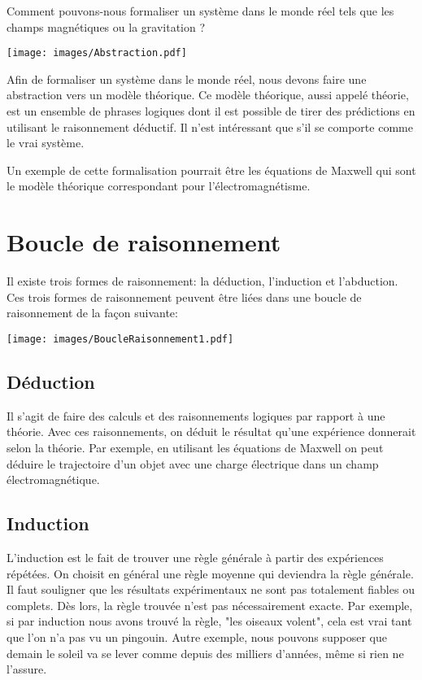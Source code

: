 Comment pouvons-nous formaliser un système dans le monde réel tels que les champs magnétiques ou la gravitation ?

\begin{center}
\texttt{[image: images/Abstraction.pdf]}
\end{center}

Afin de formaliser un système dans le monde réel, nous devons faire une abstraction vers un modèle théorique. Ce modèle théorique, aussi appelé théorie, est un ensemble de phrases logiques dont il est possible de tirer des prédictions en utilisant le raisonnement déductif. Il n'est intéressant que s'il se comporte comme le vrai système.

Un exemple de cette formalisation pourrait être les équations de Maxwell qui sont le modèle théorique correspondant pour l'électromagnétisme.

\section{Boucle de raisonnement}

Il existe trois formes de raisonnement: la déduction, l'induction et l'abduction. Ces trois formes de raisonnement peuvent être liées dans une boucle de raisonnement de la façon suivante:

\begin{center}
\texttt{[image: images/BoucleRaisonnement1.pdf]}
\end{center}

\subsection{Déduction}

Il s'agit de faire des calculs et des raisonnements logiques par rapport à une théorie. 
Avec ces raisonnements, on déduit le résultat qu'une expérience donnerait selon la théorie.
Par exemple, en utilisant les équations de Maxwell on peut déduire le trajectoire d'un
objet avec une charge électrique dans un champ électromagnétique.  \\

\subsection{Induction}

L'induction est le fait de trouver une règle générale à partir des expériences répétées.
On choisit en général une règle moyenne qui deviendra la règle générale.  Il faut souligner que les résultats expérimentaux ne sont pas totalement fiables ou complets. Dès lors, la règle trouvée n'est pas nécessairement exacte.  Par exemple, si par induction nous avons trouvé la règle, "les oiseaux volent", cela est vrai tant que l'on n’a pas vu un pingouin. Autre exemple, nous pouvons supposer que demain le soleil va se lever comme depuis des milliers d'années, même si rien ne l'assure.\\

